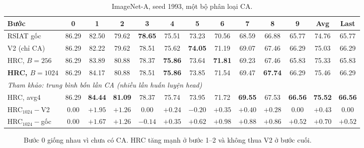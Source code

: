 \documentclass[11pt]{article}
\begin{document}
\begin{table}[H]
\centering\small
\caption{ImageNet-A, seed 1993, một bộ phân loại CA.}
\setlength{\tabcolsep}{3.2pt}
\begin{tabular}{l*{10}{c}cc}
\toprule
Bước & 0 & 1 & 2 & 3 & 4 & 5 & 6 & 7 & 8 & 9 & Avg & Last\\
\midrule
RSIAT gốc & 86.29 & 82.50 & 79.62 & \textbf{78.65} & 75.51 & 73.23 & 70.56 & 68.59 & 66.88 & 65.77 & 74.76 & 65.77\\
V2 (chỉ CA) & 86.29 & 82.22 & 79.62 & 78.51 & 75.62 & \textbf{74.05} & 71.19 & 69.07 & 67.46 & 66.29 & 75.03 & 66.29\\
HRC, $B=256$ & 86.29 & 83.89 & 80.88 & 78.37 & \textbf{75.86} & 73.64 & \textbf{71.81} & 69.23 & 67.46 & 65.83 & 75.33 & 65.83\\
\textbf{HRC, $B=1024$} & 86.29 & 84.17 & 80.88 & 78.51 & \textbf{75.86} & 73.85 & 71.54 & 69.47 & \textbf{67.74} & 66.29 & 75.46 & 66.29\\
\midrule
\multicolumn{13}{l}{\emph{Tham khảo: trung bình bốn lần CA (nhiều lần huấn luyện head)}}\\
HRC, avg4 & 86.29 & \textbf{84.44} & \textbf{81.09} & 78.37 & 75.74 & 73.95 & 71.72 & \textbf{69.55} & 67.53 & \textbf{66.56} & \textbf{75.52} & \textbf{66.56}\\
\midrule
HRC$_{1024}-$V2 & 0.00 & $+1.95$ & $+1.26$ & 0.00 & $+0.24$ & $-0.20$ & $+0.35$ & $+0.40$ & $+0.28$ & 0.00 & $+0.43$ & 0.00\\
HRC$_{1024}-$gốc & 0.00 & $+1.67$ & $+1.26$ & $-0.14$ & $+0.35$ & $+0.62$ & $+0.98$ & $+0.88$ & $+0.86$ & $+0.52$ & $+0.70$ & $+0.52$\\
\bottomrule
\end{tabular}
\end{table}

\begin{figure}[H]
\centering
{}
\caption{Bước 0 giống nhau vì chưa có CA. HRC tăng mạnh ở bước 1--2 và không thua V2 ở bước cuối.}
\end{figure}
\end{document}
